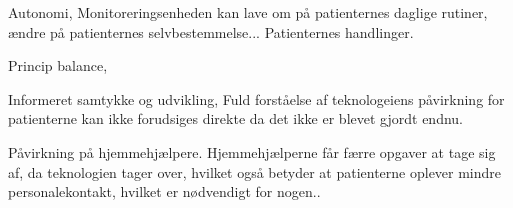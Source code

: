 Autonomi, 
Monitoreringsenheden kan lave om på patienternes daglige rutiner, ændre på patienternes selvbestemmelse... Patienternes handlinger.

Princip balance, 


Informeret samtykke og udvikling, 
Fuld forståelse af teknologeiens påvirkning for patienterne kan ikke forudsiges direkte da det ikke er blevet gjordt endnu.

Påvirkning på hjemmehjælpere.
Hjemmehjælperne får færre opgaver at tage sig af, da teknologien tager over, hvilket også betyder at patienterne oplever mindre personalekontakt, hvilket er nødvendigt for nogen..

\citep{Mittelstand2011}